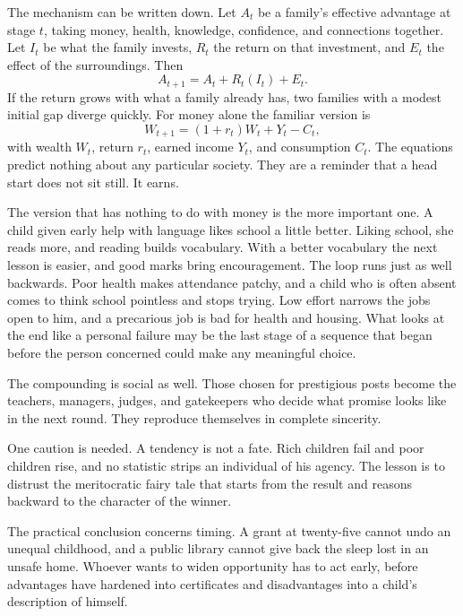 \documentclass[12pt,a4paper]{book}
\begin{document}
The mechanism can be written down. Let $A_t$ be a family's effective advantage at stage $t$, taking money, health, knowledge, confidence, and connections together. Let $I_t$ be what the family invests, $R_t$ the return on that investment, and $E_t$ the effect of the surroundings. Then
\begin{equation}
  A_{t+1} = A_t + R_t(I_t) + E_t .
  \label{eq:advantage-recurrence}
\end{equation}
If the return grows with what a family already has, two families with a modest initial gap diverge quickly. For money alone the familiar version is
\begin{equation}
  W_{t+1} = (1+r_t)W_t + Y_t - C_t ,
  \label{eq:wealth-recurrence}
\end{equation}
with wealth $W_t$, return $r_t$, earned income $Y_t$, and consumption $C_t$. The equations predict nothing about any particular society. They are a reminder that a head start does not sit still. It earns.

The version that has nothing to do with money is the more important one. A child given early help with language likes school a little better. Liking school, she reads more, and reading builds vocabulary. With a better vocabulary the next lesson is easier, and good marks bring encouragement. The loop runs just as well backwards. Poor health makes attendance patchy, and a child who is often absent comes to think school pointless and stops trying. Low effort narrows the jobs open to him, and a precarious job is bad for health and housing. What looks at the end like a personal failure may be the last stage of a sequence that began before the person concerned could make any meaningful choice.

The compounding is social as well. Those chosen for prestigious posts become the teachers, managers, judges, and gatekeepers who decide what promise looks like in the next round. They reproduce themselves in complete sincerity.

One caution is needed. A tendency is not a fate. Rich children fail and poor children rise, and no statistic strips an individual of his agency. The lesson is to distrust the meritocratic fairy tale that starts from the result and reasons backward to the character of the winner.

The practical conclusion concerns timing. A grant at twenty-five cannot undo an unequal childhood, and a public library cannot give back the sleep lost in an unsafe home. Whoever wants to widen opportunity has to act early, before advantages have hardened into certificates and disadvantages into a child's description of himself.
\end{document}
